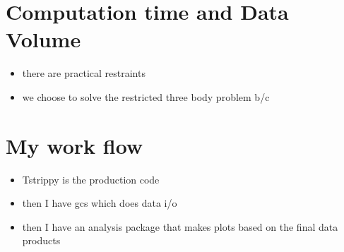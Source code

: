     \section{Computation time and Data Volume}
    \begin{itemize}
        \item there are practical restraints
        \item we choose to solve the restricted three body problem b/c
    \end{itemize}

\section{My work flow}
    \begin{itemize}
        \item Tstrippy is the production code
        \item then I have gcs which does data i/o
        \item then I have an analysis package that makes plots based on the final data products
    \end{itemize}

